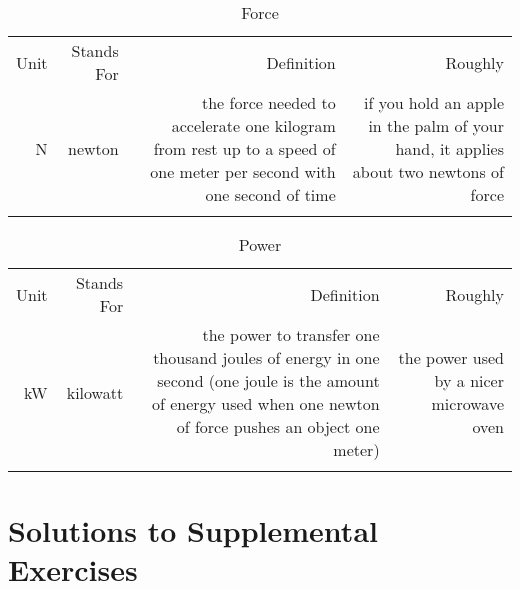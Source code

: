\documentclass[12pt,]{book}
\theoremstyle{plain}
\theoremstyle{definition}
\theoremstyle{definition}
\theoremstyle{definition}
\theoremstyle{definition}
\theoremstyle{definition}
\numberwithin{equation}{section}
\newcommand{\hrulemedium}{\noalign{\hrule height 0.07em}}
\newcommand{\hrulethick} {\noalign{\hrule height 0.11em}}
\begin{document}
\leavevmode%
\begin{table}
\centering
\begin{tabular}{r r r r}\hrulethick
Unit&Stands For&Definition&Roughly\tabularnewline\hrulemedium
\si{\newton}&newton&the force needed to accelerate one kilogram from rest up to a speed of one meter per second with one second of time&if you hold an apple in the palm of your hand, it applies about two newtons of force\tabularnewline\hrulethick
\end{tabular}
\caption{Force\label{table-23}}
\end{table}
\leavevmode%
\begin{table}
\centering
\begin{tabular}{r r r r}\hrulethick
Unit&Stands For&Definition&Roughly\tabularnewline\hrulemedium
\si{\kilo\watt}&kilowatt&the power to transfer one thousand joules of energy in one second (one joule is the amount of energy used when one newton of force pushes an object one meter)&the power used by a nicer microwave oven\tabularnewline\hrulethick
\end{tabular}
\caption{Power\label{table-24}}
\end{table}
\typeout{************************************************}
\typeout{************************************************}
\chapter[{Solutions to Supplemental Exercises}]{Solutions to Supplemental Exercises}\label{supplemental-solutions}
\end{document}
